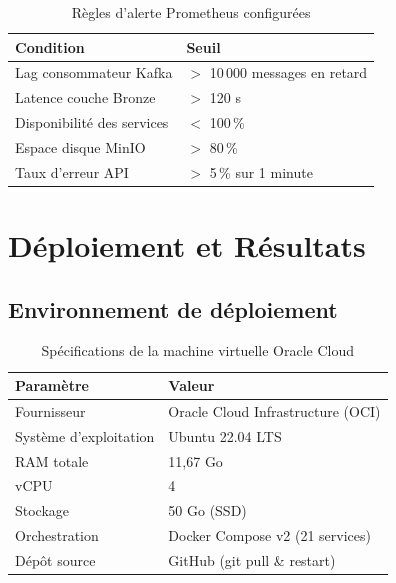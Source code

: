 \documentclass[12pt,a4paper]{report}
\begin{document}
\begin{table}[h]
\centering
\caption{Règles d'alerte Prometheus configurées}
\label{tab:alerts}
\renewcommand{\arraystretch}{1.3}
\begin{tabular}{ll}
\toprule
\textbf{Condition} & \textbf{Seuil} \\
\midrule
Lag consommateur Kafka & $>$ 10\,000 messages en retard \\
Latence couche Bronze & $>$ 120 s \\
Disponibilité des services & $<$ 100\,\% \\
Espace disque MinIO & $>$ 80\,\% \\
Taux d'erreur API & $>$ 5\,\% sur 1 minute \\
\bottomrule
\end{tabular}
\end{table}

\chapter{Déploiement et Résultats}

\section{Environnement de déploiement}

\begin{table}[h]
\centering
\caption{Spécifications de la machine virtuelle Oracle Cloud}
\label{tab:vm}
\renewcommand{\arraystretch}{1.3}
\begin{tabular}{ll}
\toprule
\textbf{Paramètre}       & \textbf{Valeur} \\
\midrule
Fournisseur              & Oracle Cloud Infrastructure (OCI) \\
Système d'exploitation   & Ubuntu 22.04 LTS \\
RAM totale               & 11,67 Go \\
vCPU                     & 4 \\
Stockage                 & 50 Go (SSD) \\
Orchestration            & Docker Compose v2 (21 services) \\
Dépôt source             & GitHub (git pull \& restart) \\
\bottomrule
\end{tabular}
\end{table}
\end{document}
